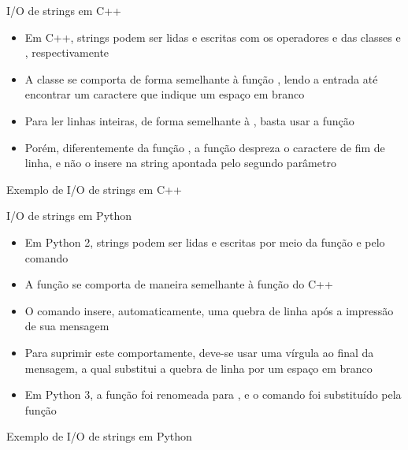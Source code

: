 \begin{frame}[fragile]{I/O de strings em C++}

    \begin{itemize}
        \item Em C++, strings podem ser lidas e escritas com os operadores  e
             das classes  e , respectivamente

        \item A classe  se comporta de forma semelhante à função , 
            lendo a entrada até encontrar um caractere que indique um espaço em branco

        \item Para ler linhas inteiras, de forma semelhante à , basta usar a 
            função 

        \item Porém, diferentemente da função , a função  
            despreza o caractere de fim de linha, e não o insere na string apontada pelo segundo 
            parâmetro
    \end{itemize}

\end{frame}

\begin{frame}[fragile]{Exemplo de I/O de strings em C++}
\end{frame}

\begin{frame}[fragile]{I/O de strings em Python}

    \begin{itemize}
        \item Em Python 2, strings podem ser lidas e escritas por meio da função
             e pelo comando 

        \item A função  se comporta de maneira semelhante à função
             do C++

        \item O comando  insere, automaticamente, uma quebra de linha após
            a impressão de sua mensagem

        \item Para suprimir este comportamente, deve-se usar uma vírgula ao final da mensagem,
            a qual substitui a quebra de linha por um espaço em branco

        \item Em Python 3, a função  foi renomeada para ,
            e o comando  foi substituído pela função 
    \end{itemize} 

\end{frame}

\begin{frame}[fragile]{Exemplo de I/O de strings em Python}
\end{frame}



